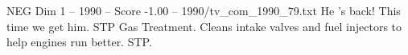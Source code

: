 \begin{textsample}{NEG Dim 1 – 1990 – Score -1.00 – 1990/tv\_com\_1990\_79.txt}  \label{ex:f1_neg_044}
He 's back!
This time we get him.
STP Gas Treatment.
Cleans intake valves and fuel injectors to help engines run better.
STP.

\end{textsample}
